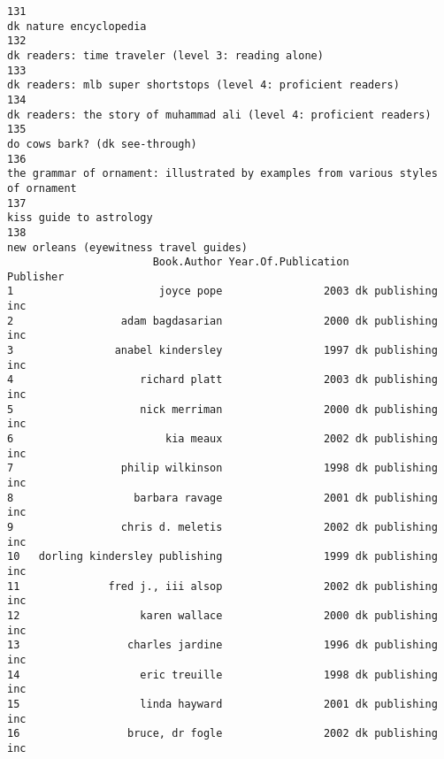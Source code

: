 \documentclass[
]{report}
\begin{document}
\begin{verbatim}
131                                                                                                                                                dk nature encyclopedia
132                                                                                                                    dk readers: time traveler (level 3: reading alone)
133                                                                                                        dk readers: mlb super shortstops (level 4: proficient readers)
134                                                                                                   dk readers: the story of muhammad ali (level 4: proficient readers)
135                                                                                                                                        do cows bark? (dk see-through)
136                                                                                      the grammar of ornament: illustrated by examples from various styles of ornament
137                                                                                                                                               kiss guide to astrology
138                                                                                                                                new orleans (eyewitness travel guides)
                       Book.Author Year.Of.Publication         Publisher
1                       joyce pope                2003 dk publishing inc
2                 adam bagdasarian                2000 dk publishing inc
3                anabel kindersley                1997 dk publishing inc
4                    richard platt                2003 dk publishing inc
5                    nick merriman                2000 dk publishing inc
6                        kia meaux                2002 dk publishing inc
7                 philip wilkinson                1998 dk publishing inc
8                   barbara ravage                2001 dk publishing inc
9                 chris d. meletis                2002 dk publishing inc
10   dorling kindersley publishing                1999 dk publishing inc
11              fred j., iii alsop                2002 dk publishing inc
12                   karen wallace                2000 dk publishing inc
13                 charles jardine                1996 dk publishing inc
14                   eric treuille                1998 dk publishing inc
15                   linda hayward                2001 dk publishing inc
16                 bruce, dr fogle                2002 dk publishing inc

\end{verbatim}
\end{document}
